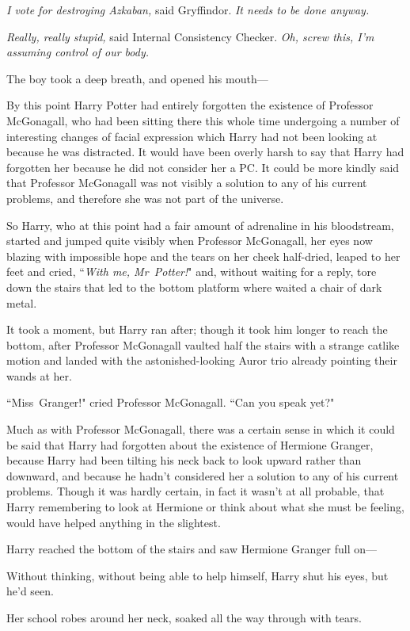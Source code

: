 \emph{I vote for destroying Azkaban,} said Gryffindor. \emph{It needs to be done anyway.}

\emph{Really, really stupid,} said Internal Consistency Checker. \emph{Oh, screw this, I'm assuming control of our body.}

The boy took a deep breath, and opened his mouth—

By this point Harry Potter had entirely forgotten the existence of Professor McGonagall, who had been sitting there this whole time undergoing a number of interesting changes of facial expression which Harry had not been looking at because he was distracted. It would have been overly harsh to say that Harry had forgotten her because he did not consider her a PC. It could be more kindly said that Professor McGonagall was not visibly a solution to any of his current problems, and therefore she was not part of the universe.

So Harry, who at this point had a fair amount of adrenaline in his bloodstream, started and jumped quite visibly when Professor McGonagall, her eyes now blazing with impossible hope and the tears on her cheek half-dried, leaped to her feet and cried, ``\emph{With me, Mr~Potter!}" and, without waiting for a reply, tore down the stairs that led to the bottom platform where waited a chair of dark metal.

It took a moment, but Harry ran after; though it took him longer to reach the bottom, after Professor McGonagall vaulted half the stairs with a strange catlike motion and landed with the astonished-looking Auror trio already pointing their wands at her.

``Miss~Granger!" cried Professor McGonagall. ``Can you speak yet?"

Much as with Professor McGonagall, there was a certain sense in which it could be said that Harry had forgotten about the existence of Hermione Granger, because Harry had been tilting his neck back to look upward rather than downward, and because he hadn't considered her a solution to any of his current problems. Though it was hardly certain, in fact it wasn't at all probable, that Harry remembering to look at Hermione or think about what she must be feeling, would have helped anything in the slightest.

Harry reached the bottom of the stairs and saw Hermione Granger full on—

Without thinking, without being able to help himself, Harry shut his eyes, but he'd seen.

Her school robes around her neck, soaked all the way through with tears.

